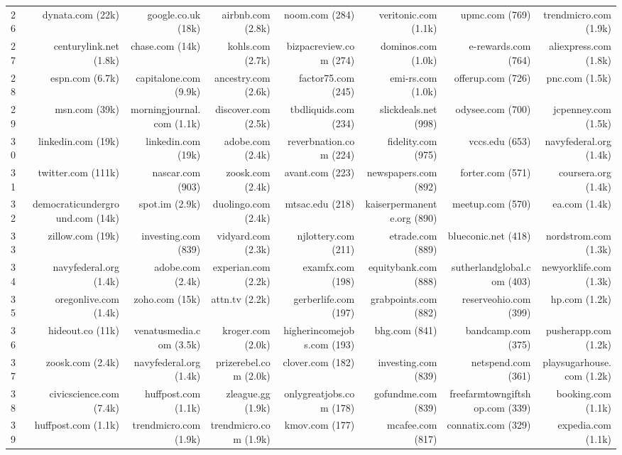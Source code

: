 \begin{table}[htbp]
\begin{adjustbox}{max width=\textwidth}
\begin{tabular}{lrrrrrrr}
26 & dynata.com (22k) & google.co.uk (18k) & airbnb.com (2.8k) & noom.com (284) & veritonic.com (1.1k) & upmc.com (769) & trendmicro.com (1.9k) \\
27 & centurylink.net (1.8k) & chase.com (14k) & kohls.com (2.7k) & bizpacreview.com (274) & dominos.com (1.0k) & e-rewards.com (764) & aliexpress.com (1.8k) \\
28 & espn.com (6.7k) & capitalone.com (9.9k) & ancestry.com (2.6k) & factor75.com (245) & emi-rs.com (1.0k) & offerup.com (726) & pnc.com (1.5k) \\
29 & msn.com (39k) & morningjournal.com (1.1k) & discover.com (2.5k) & tbdliquids.com (234) & slickdeals.net (998) & odysee.com (700) & jcpenney.com (1.5k) \\
30 & linkedin.com (19k) & linkedin.com (19k) & adobe.com (2.4k) & reverbnation.com (224) & fidelity.com (975) & vccs.edu (653) & navyfederal.org (1.4k) \\
31 & twitter.com (111k) & nascar.com (903) & zoosk.com (2.4k) & avant.com (223) & newspapers.com (892) & forter.com (571) & coursera.org (1.4k) \\
32 & democraticunderground.com (14k) & spot.im (2.9k) & duolingo.com (2.4k) & mtsac.edu (218) & kaiserpermanente.org (890) & meetup.com (570) & ea.com (1.4k) \\
33 & zillow.com (19k) & investing.com (839) & vidyard.com (2.3k) & njlottery.com (211) & etrade.com (889) & blueconic.net (418) & nordstrom.com (1.3k) \\
34 & navyfederal.org (1.4k) & adobe.com (2.4k) & experian.com (2.2k) & examfx.com (198) & equitybank.com (888) & sutherlandglobal.com (403) & newyorklife.com (1.3k) \\
35 & oregonlive.com (1.4k) & zoho.com (15k) & attn.tv (2.2k) & gerberlife.com (197) & grabpoints.com (882) & reserveohio.com (399) & hp.com (1.2k) \\
36 & hideout.co (11k) & venatusmedia.com (3.5k) & kroger.com (2.0k) & higherincomejobs.com (193) & bhg.com (841) & bandcamp.com (375) & pusherapp.com (1.2k) \\
37 & zoosk.com (2.4k) & navyfederal.org (1.4k) & prizerebel.com (2.0k) & clover.com (182) & investing.com (839) & netspend.com (361) & playsugarhouse.com (1.2k) \\
38 & civicscience.com (7.4k) & huffpost.com (1.1k) & zleague.gg (1.9k) & onlygreatjobs.com (178) & gofundme.com (839) & freefarmtowngiftshop.com (339) & booking.com (1.1k) \\
39 & huffpost.com (1.1k) & trendmicro.com (1.9k) & trendmicro.com (1.9k) & kmov.com (177) & mcafee.com (817) & connatix.com (329) & expedia.com (1.1k) \\

\end{tabular}
\end{adjustbox}
\end{table}

